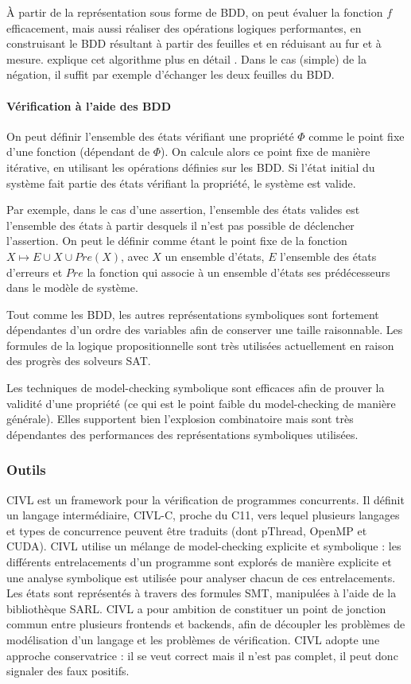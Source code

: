 À partir de la représentation sous forme de BDD, on peut évaluer la
fonction \(f\) efficacement, mais aussi réaliser des opérations logiques
performantes, en construisant le BDD résultant à partir des
feuilles et en réduisant au fur et à mesure. \cite{OBDD} explique cet
algorithme plus en détail . Dans le cas (simple) de la
négation, il suffit par exemple d'échanger les deux feuilles du BDD.

\paragraph{Vérification à l'aide des BDD}

On peut définir l'ensemble des états vérifiant une propriété \(\Phi\)
comme le point fixe d'une fonction (dépendant de \(\Phi\)). On calcule
alors ce point fixe de manière itérative, en utilisant les opérations définies
sur les BDD. Si l'état initial du système fait partie des états vérifiant la
propriété, le système est valide.

Par exemple, dans le cas d'une assertion, l'ensemble des états valides est
l'ensemble des états à partir desquels il n'est pas possible de déclencher
l'assertion. On peut le définir comme étant le point fixe de la fonction \(X
\mapsto E \cup X \cup Pre(X)\), avec \(X\) un ensemble d'états, \(E\) l'ensemble
des états d'erreurs et \(Pre\) la fonction qui associe à un ensemble d'états ses
prédécesseurs dans le modèle de système.

Tout comme les BDD, les autres représentations symboliques sont fortement
dépendantes d'un ordre des variables afin de conserver une taille
raisonnable. Les formules de la logique propositionnelle sont très
utilisées actuellement en raison des progrès des solveurs SAT.

Les techniques de model-checking symbolique sont efficaces afin de
prouver la validité d'une propriété (ce qui est le point faible du
model-checking de manière générale). Elles supportent bien l'explosion
combinatoire mais sont très dépendantes des performances des
représentations symboliques utilisées.

\subsubsection{Outils}

CIVL\cite{CIVL} est un framework pour la vérification de programmes concurrents.
Il définit un langage intermédiaire, CIVL-C, proche du C11, vers lequel plusieurs
langages et types de concurrence peuvent être traduits (dont pThread, OpenMP et
CUDA). CIVL utilise un mélange de model-checking explicite et symbolique : les
différents entrelacements d'un programme sont explorés de manière explicite et
une analyse symbolique est utilisée pour analyser chacun de ces entrelacements.
Les états sont représentés à travers des formules SMT, manipulées à l'aide de la
bibliothèque SARL\cite{SARL}. CIVL a pour ambition de constituer un point de
jonction commun entre plusieurs frontends et backends, afin de découpler les
problèmes de modélisation d'un langage et les problèmes de vérification. CIVL
adopte une approche conservatrice : il se veut correct mais il n'est pas
complet, il peut donc signaler des faux positifs.

